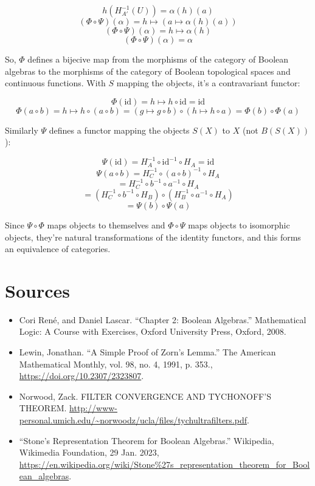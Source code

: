 \documentclass{article}
\begin{document}
      \[ h ( H_{A'}^{-1} (U)) = \alpha(h)(a)\] \[(\Phi \circ \Psi)(\alpha) = h
      \mapsto (a \mapsto \alpha(h)(a))\] \[(\Phi \circ \Psi)(\alpha) =  h
      \mapsto \alpha(h)\] \[(\Phi \circ \Psi)(\alpha) = \alpha\]

      So, $\Phi$ defines a bijecive map from the morphisms of the category of Boolean
      algebras to the morphisms of the category of Boolean
      topological spaces and continuous functions. With $S$ mapping the objects,
      it's a contravariant functor:

      \[ \Phi(\text{id}) = h \mapsto h \circ \text{id} = \text{id} \]
      \[ \Phi(a \circ b) = h \mapsto h \circ (a \circ b) = (g \mapsto g \circ b)
      \circ (h \mapsto h \circ a) = \Phi(b) \circ \Phi(a) \]

      Similarly $\Psi$ defines a functor mapping the objects $S(X)$ to $X$ (not
      $B(S(X))$):

      \[ \Psi(\text{id}) = H_A^{-1} \circ \text{id}^{-1} \circ H_A = \text{id} \]
      \[ \Psi(a \circ b) = H_C^{-1} \circ (a \circ b)^{-1} \circ H_A \]
      \[ = H_C^{-1} \circ b^{-1} \circ a^{-1} \circ H_A \]
      \[ = (H_C^{-1} \circ b^{-1} \circ H_B) \circ (H_B^{-1} \circ a^{-1} \circ
      H_A) \]
      \[ = \Psi(b) \circ \Psi(a) \]

      Since $\Psi \circ \Phi$ maps objects to themselves and $\Phi \circ \Psi$
      maps objects to isomorphic objects, they're natural transformations of the
      identity functors, and this forms an equivalence of categories.

    \section{Sources}

    \begin{itemize}
      \item Cori Ren\'e, and Daniel Lascar. “Chapter 2: Boolean Algebras.” Mathematical Logic: A Course with Exercises, Oxford University Press, Oxford, 2008. 
      \item Lewin, Jonathan. “A Simple Proof of Zorn's Lemma.” The American
      Mathematical Monthly, vol. 98, no. 4, 1991, p. 353.,
      \url{https://doi.org/10.2307/2323807}.
      \item Norwood, Zack. FILTER CONVERGENCE AND TYCHONOFF’S THEOREM.
      \url{http://www-personal.umich.edu/~norwoodz/ucla/files/tychultrafilters.pdf}.
      \item “Stone's Representation Theorem for Boolean Algebras.” Wikipedia,
      Wikimedia Foundation, 29 Jan. 2023,
      \url{https://en.wikipedia.org/wiki/Stone%27s_representation_theorem_for_Boolean_algebras}.
    \end{itemize}
\end{document}
